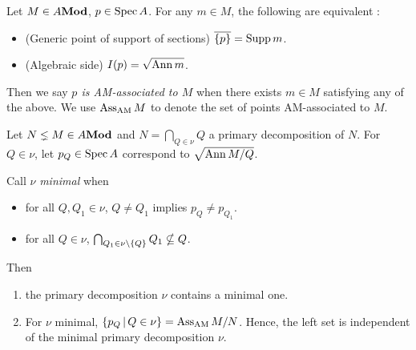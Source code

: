 \begin{dfn}
  
  Let $M \in A\mathbf{Mod}$, $p \in \operatorname{Spec} A$.
  For any $m \in M$, 
  the following are equivalent : 
  \begin{itemize}
    \item (Generic point of support of sections) $\overline{\left\{p\right\}} = \operatorname{Supp} m$.
    \item (Algebraic side) $I(p) = \sqrt{\operatorname{Ann} m}$.
  \end{itemize}
  Then we say \textit{$p$ is AM-associated to $M$} when 
  there exists $m \in M$ satisfying any of the above. 
  We use $\text{Ass}_{\text{AM}}\, M$ to denote the set of points AM-associated to $M$.
\end{dfn}

\begin{prop}

  Let $N \lneq M \in A\mathbf{Mod}$ and 
  $N = \bigcap_{Q \in \nu} Q$ a primary decomposition of $N$.
  For $Q \in \nu$, let $p_Q \in \operatorname{Spec} A$ correspond to $\sqrt{\operatorname{Ann} M/Q}$.

  Call $\nu$ \textit{minimal} when 
  \begin{itemize}
    \item for all $Q, Q_1 \in \nu$, $Q \neq Q_1$ implies 
    $p_Q \neq p_{Q_1}$.
    \item for all $Q \in \nu$, 
    $\bigcap_{Q_1 \in \nu\setminus \left\{Q\right\}} Q_1 \nsubseteq Q$.
  \end{itemize}
  Then 
  \begin{enumerate}
    \item the primary decomposition $\nu$ contains a minimal one.
    \item For $\nu$ minimal, 
    $\left\{p_Q \,|\, Q \in \nu\right\} = \text{Ass}_{\text{AM}}\, M/N$.
    Hence, the left set is independent of 
    the minimal primary decomposition $\nu$.
  \end{enumerate}
\end{prop}
